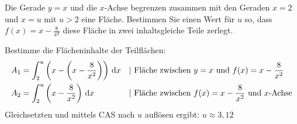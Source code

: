 Die Gerade $y=x$ und die $x$-Achse begrenzen zusammen mit den Geraden $x=2$ und $x=u$ mit $u>2$ eine Fläche. Bestimmen Sie einen Wert für $u$ so, dass $f(x)=x-\frac{8}{x^2}$ diese Fläche in zwei inhaltsgleiche Teile zerlegt. \cas
\begin{lsg}{}
  Bestimme die Flächeninhalte der Teilflächen:\begin{align*}
  A_1&=\int_2^u\left(x-\left(x-\frac{8}{x^2}\right)\right)\d x&&|\ \text{Fläche zwischen $y=x$ und $f(x)=x-\frac{8}{x^2}$}\\
  A_2&= \int_2^u\left(x-\frac{8}{x^2}\right)\d x&&|\ \text{Fläche zwischen $f(x)=x-\frac{8}{x^2}$ und $x$-Achse}
  \end{align*}
  Gleichsetzten und mittels CAS nach $u$ auflösen ergibt: $u\approx 3,12$
\end{lsg}




